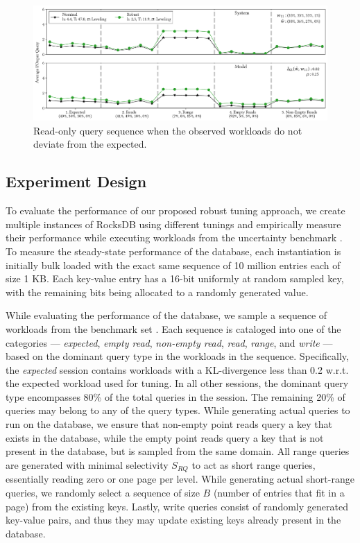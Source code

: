 \begin{figure}[ht]
    \centering
    \includegraphics[scale=0.5]{figures/query_seq_read_1.pdf}
    \caption{Read-only query sequence when the observed workloads {\obsworkload}
        do not deviate from the expected.
    }
    \label{fig:query_seq_reads_1}
\end{figure}

\subsection{Experiment Design}

To evaluate the performance of our proposed robust tuning approach, we create
    multiple instances of RocksDB using different tunings and empirically
    measure their performance while executing workloads from the uncertainty
    benchmark {\benchmark}.
To measure the steady-state performance of the database, each instantiation is
    initially bulk loaded with the exact same sequence of 10 million
    entries each of size 1 KB.
Each key-value entry has a 16-bit uniformly at random 
    sampled key, with the remaining bits being allocated to a randomly 
    generated value.

While evaluating the performance of the database, we sample a sequence of 
    workloads from the benchmark set {\benchmark}.
Each sequence is cataloged into one of the categories — \emph{expected}, 
    \emph{empty read}, \emph{non-empty read}, \emph{read}, \emph{range}, 
    and \emph{write} — based on the dominant query type in the workloads
    in the sequence.
Specifically, the \emph{expected} session contains workloads with a
    KL-divergence less than 0.2 w.r.t. the expected workload used for tuning. 
In all other sessions, the dominant query type encompasses 80\% of the total
    queries in the session.
The remaining 20\% of queries may belong to any of the query types.
While generating actual queries to run on the database, we ensure that non-empty
    point reads query a key that exists in the database, while the empty
    point reads query a key that is not present in the database, but is sampled
    from the same domain.
All range queries are generated with minimal selectivity $S_{RQ}$ to act as 
    short range queries, essentially reading zero or one page per level.
While generating actual short-range queries, we randomly select a sequence of 
    size $B$ (number of entries that fit in a page) from the existing keys. 
Lastly, write queries consist of randomly generated key-value pairs, 
    and thus they may update existing keys already present 
    in the database.

